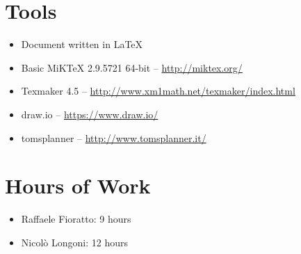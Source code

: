 \newpage
\begin{appendices}
\section{Tools}
\begin{itemize}
	\item Document written in \LaTeX
	\item Basic MiKTeX 2.9.5721 64-bit -- \url{http://miktex.org/}
	\item Texmaker 4.5 -- \url{http://www.xm1math.net/texmaker/index.html}
	\item draw.io -- \url{https://www.draw.io/}
	\item tomsplanner -- \url{http://www.tomsplanner.it/}
\end{itemize}
\break
\section{Hours of Work}
\begin{itemize}
	\item Raffaele Fioratto: 9 hours
	\item Nicol\`{o} Longoni: 12 hours 
\end{itemize}
\end{appendices}